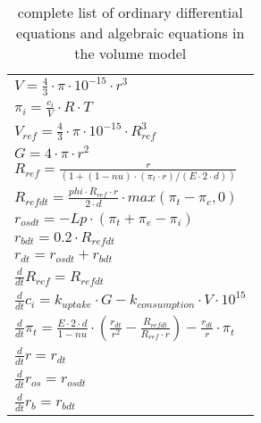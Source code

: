 \begin{table} [h]
	
	\begin{center} 
		\caption{complete list of ordinary differential equations and algebraic equations in the volume model}
		\begin{tabular} {l}
			\toprule
			$V = \frac{4}{3}\cdot \pi  \cdot 10^{-15} \cdot r^3$ \\
			$\pi_i = \frac{c_i}{V} \cdot R\cdot T$\\
			$V_{ref} =  \frac{4}{3} \cdot \pi \cdot 10^{-15} \cdot R_{ref}^3$\\
			$G = 4 \cdot  \pi \cdot r^2$\\
			$R_{ref} = \frac{r}{(1 + (1 - nu)\cdot (\pi_t \cdot r) / (E\cdot 2\cdot d))} $\\
			$R_{refdt}= \frac{phi\cdot R_{ref}\cdot r }{2\cdot d} \cdot max(\pi_t- \pi_c, 0)$\\
			$r_{osdt }= - Lp\cdot (\pi_t + \pi_e - \pi_i)$\\
			$r_{bdt} = 0.2\cdot R_{refdt}$\\
			$r_{dt} = r_{osdt} + r_{bdt}$  \\
			$\frac{d}{dt} R_{ref} = R_{refdt}$\\
			$\frac{d}{dt}  c_i = k_{uptake}\cdot G - k_{consumption}\cdot V\cdot 10^{15}$\\
			$\frac{d}{dt} \pi_t = \frac{E\cdot 2\cdot d }{1 - nu} \cdot (\frac{r_{dt}}{r^2 } - \frac{R_{refdt}}{R_{ref} \cdot r}) - \frac{r_{dt}}{ r} \cdot \pi_t$\\
			$\frac{d}{dt}  r = r_{dt}$\\
			$\frac{d}{dt} r_{os} = r_{osdt}$\\
			$\frac{d}{dt}  r_b = r_{bdt}$\\
			
			\bottomrule
		\end{tabular}
		\label{equationsVolume}
	\end{center}
\end{table}

\newpage
